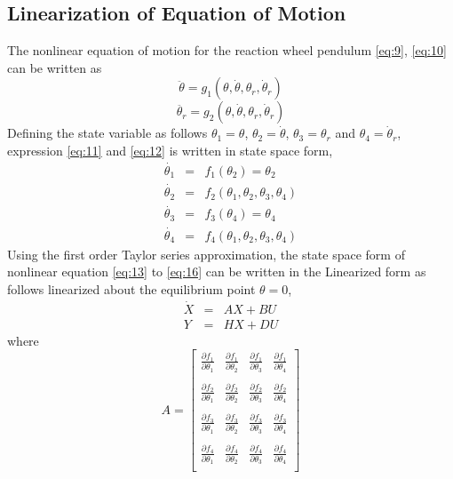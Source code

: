 \documentclass[a4paper]{article}
\begin{document}
\subsection{Linearization of Equation of Motion}
The nonlinear equation of motion for the reaction wheel pendulum \ref{eq:9}, \ref{eq:10} can be written as
\begin{equation}
\ddot{\theta} = g_1(\theta,\dot \theta,\theta_r,\dot \theta_r)
\label{eq:11}
\end{equation}
\begin{equation}
\ddot{\theta_r} = g_2(\theta,\dot \theta,\theta_r,\dot \theta_r)
\label{eq:12}
\end{equation}
Defining the state variable as follows $\theta_1 = \theta$, $\theta_2 = \dot \theta$, $\theta_3 = \theta_r$ and $\theta_4 = \dot \theta_r$, expression \ref{eq:11} and \ref{eq:12} is written in state space form, 
\begin{eqnarray}
\dot{\theta_1} &=& f_1(\theta_2) = \theta_2 \label{eq:13}\\
\dot{\theta_2} &=& f_2(\theta_1,\theta_2,\theta_3,\theta_4) \label{eq:14}\\
\dot{\theta_3} &=& f_3(\theta_4) =  \theta_4 \label{eq:15} \\
\dot{\theta_4} &=& f_4(\theta_1,\theta_2,\theta_3,\theta_4) \label{eq:16}
\end{eqnarray}
Using the first order Taylor series approximation, the state space form of nonlinear equation \ref{eq:13} to \ref{eq:16} can be written in the Linearized form as follows linearized about the equilibrium point $\theta = 0$,
\begin{eqnarray}
\dot X &=& AX+BU \label{eq:19}\\
Y &=& HX+DU \label{eq:20}
\end{eqnarray}
where
\begin{equation}
A = \left[\begin{array}{cccc}
\frac{\partial f_1}{\partial \theta_1}& \frac{\partial f_1}{\partial \theta_2}  &  \frac{\partial f_1}{\partial \theta_3}  & \frac{\partial f_1}{\partial \theta_4}  \\ 
&&&\\
\frac{\partial f_2}{\partial \theta_1}& \frac{\partial f_2}{\partial \theta_2}  &  \frac{\partial f_2}{\partial \theta_3}  & \frac{\partial f_2}{\partial \theta_4}  \\  
&&&\\
\frac{\partial f_3}{\partial \theta_1}& \frac{\partial f_3}{\partial \theta_2}  &  \frac{\partial f_3}{\partial \theta_3}  & \frac{\partial f_3}{\partial \theta_4}  \\ 
&&&\\
\frac{\partial f_4}{\partial \theta_1}& \frac{\partial f_4}{\partial \theta_2}  &  \frac{\partial f_4}{\partial \theta_3}  & \frac{\partial f_4}{\partial \theta_4}  \\  
\end{array} \right]
\end{equation}\\
\end{document}
